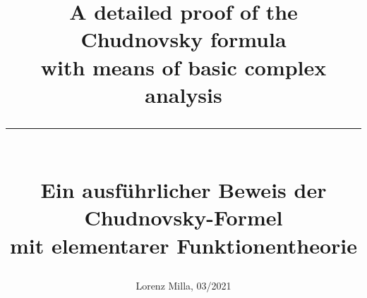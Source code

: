 \documentclass[a4paper,10pt]{amsart}
\begin{document}
    \title{\Large{A detailed proof of the Chudnovsky formula\\with means of basic complex analysis}\\[2ex]
        \hrule~\\[2ex]
        \Large{Ein ausführlicher Beweis der Chudnovsky-Formel\\mit elementarer Funktionentheorie}}
    \author{Lorenz Milla, 03/2021}

  \entrue
  
  \vfill\pagebreak
  
  \enfalse
  
\end{document}
